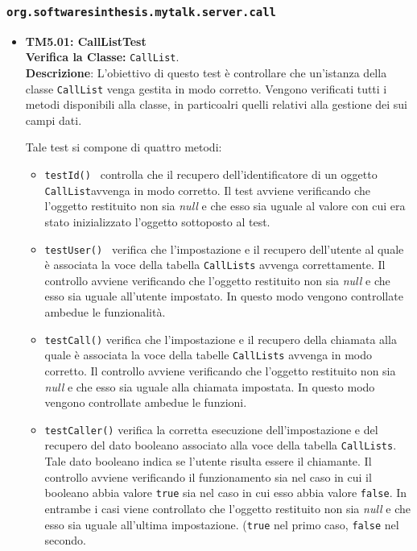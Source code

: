 \subsubsection{\texttt{org.softwaresinthesis.mytalk.server.call}}
\begin{itemize}
\item \textbf{TM5.01: CallListTest}\\
\textbf{Verifica la Classe:} \texttt{CallList}.\\
\textbf{Descrizione}: L'obiettivo di questo test è controllare che un'istanza della classe \texttt{CallList} venga gestita in modo corretto. Vengono verificati tutti i metodi disponibili alla classe, in particoalri quelli relativi alla gestione dei sui campi dati.

Tale test si compone di quattro metodi:
\begin{itemize}
\item \texttt{testId() } controlla che il recupero dell'identificatore di un oggetto \texttt{CallList}avvenga in modo corretto. 
Il test avviene verificando che l'oggetto restituito non sia \textit{null} e che esso sia uguale al valore con cui era stato inizializzato l'oggetto sottoposto al test.
\item \texttt{testUser() } verifica che l'impostazione e il recupero dell'utente al quale è associata la voce della tabella \texttt{CallLists} avvenga correttamente. 
Il controllo avviene verificando che l'oggetto restituito non sia \textit{null} e che esso sia uguale all'utente impostato. In questo modo vengono controllate ambedue le funzionalità.
\item \texttt{testCall()} verifica che l'impostazione e il recupero della chiamata alla quale è associata la voce della tabelle \texttt{CallLists} avvenga in modo corretto. Il controllo avviene verificando che l'oggetto restituito non sia \textit{null} e che esso sia uguale alla chiamata impostata. In questo modo vengono controllate ambedue le funzioni.

\item \texttt{testCaller()} verifica la corretta esecuzione  dell'impostazione e del recupero del dato booleano associato alla voce della tabella \texttt{CallLists}. Tale dato booleano indica se l'utente risulta essere il chiamante.
Il controllo avviene verificando il funzionamento sia nel caso in cui il booleano abbia valore \texttt{true} sia nel caso in cui esso abbia valore \texttt{false}.
In entrambe i casi viene controllato che l'oggetto restituito non sia \textit{null} e che esso sia uguale all'ultima impostazione. (\texttt{true} nel primo caso, \texttt{false} nel secondo.


\end{itemize}
\end{itemize}
